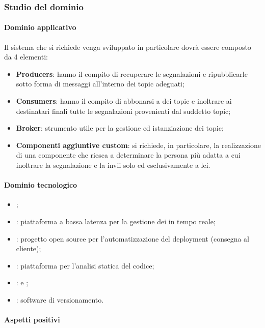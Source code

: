 		\subsubsection{Studio del dominio}
			\paragraph{Dominio applicativo} \Spazio
			Il sistema che si richiede venga sviluppato in particolare dovrà essere composto da 4 elementi:
			\begin{itemize}	 
\item \textbf{{Producers}}: hanno il compito di recuperare le segnalazioni e ripubblicarle sotto forma di messaggi all'interno dei
topic adeguati;
\item \textbf{{Consumers}}: hanno il compito di abbonarsi a dei topic e inoltrare ai destinatari finali tutte le segnalazioni
provenienti dal suddetto topic;
\item \textbf{{Broker}}: strumento utile per la gestione ed istanziazione dei topic;
\item \textbf{{Componenti aggiuntive custom}}: si richiede, in particolare, la realizzazione di una componente che riesca a determinare la persona più adatta a cui inoltrare la segnalazione e la invii solo ed esclusivamente a lei.
			\end{itemize}
			\paragraph{Dominio tecnologico}
			\begin{itemize}
				\item \textbf{}; 
				\item  \textbf{}: piattaforma a bassa latenza per la gestione dei  in tempo reale;
				\item  \textbf{}: progetto open source per l'automatizzazione del deployment (consegna al cliente);
				\item  \textbf{}: piattaforma per l'analisi statica del codice;
				\item  \textbf{}:  e ;
				\item  \textbf{}: software di versionamento.
			\end{itemize}
			
			\paragraph{Aspetti positivi}

